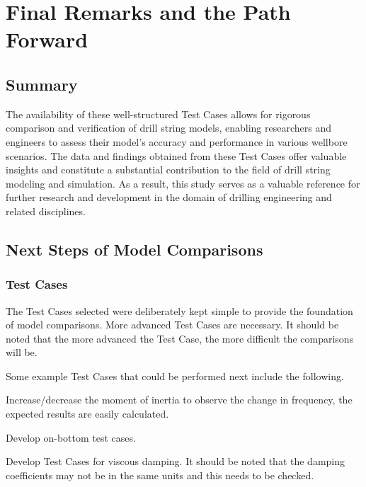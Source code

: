 \chapter{Final Remarks and the Path Forward}
\section{Summary}
The availability of these well-structured Test Cases allows for rigorous comparison and verification of drill string models, enabling researchers and engineers to assess their model's accuracy and performance in various wellbore scenarios. The data and findings obtained from these Test Cases offer valuable insights and constitute a substantial contribution to the field of drill string modeling and simulation. As a result, this study serves as a valuable reference for further research and development in the domain of drilling engineering and related disciplines.

\section{Next Steps of Model Comparisons}
\subsection{Test Cases}
The Test Cases selected were deliberately kept simple to provide the foundation of model comparisons.  More advanced Test Cases are necessary.  It should be noted that the more advanced the Test Case, the more difficult the comparisons will be.

Some example Test Cases that could be performed next include the following.
\begin{bulletedlist}
	\item Increase/decrease the moment of inertia to observe the change in frequency, the expected results are easily calculated.
	\item Develop on-bottom test cases.
    \item Develop Test Cases for viscous damping.  It should be noted that the damping coefficients may not be in the same units and this needs to be checked.
\end{bulletedlist}

